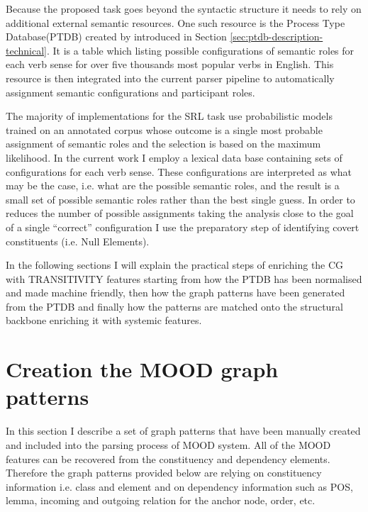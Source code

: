 Because the proposed task goes beyond the syntactic structure it needs to rely on additional external semantic resources. One such resource is the Process Type Database(PTDB) created by \citet{Neale2002} introduced in Section \ref{sec:ptdb-description-technical}. It is a table which listing possible configurations of semantic roles for each verb sense for over five thousands most popular verbs in English. This resource is then integrated into the current parser pipeline to automatically assignment semantic configurations and participant roles.


The majority of implementations for the SRL task use probabilistic models trained on an annotated corpus whose outcome is a single most probable assignment of semantic roles and the selection is based on the maximum likelihood. In the current work I employ a lexical data base containing sets of configurations for each verb sense. These configurations are interpreted as what may be the case, i.e. what are the possible semantic roles, and the result is a small set of possible semantic roles rather than the best single guess. In order to reduces the number of possible assignments taking the analysis close to the goal of a single ``correct'' configuration I use the preparatory step of identifying covert constituents (i.e. Null Elements).

In the following sections I will explain the practical steps of enriching the CG with TRANSITIVITY features starting from how the PTDB has been normalised and made machine friendly, then how the graph patterns have been generated from the PTDB and finally how the patterns are matched onto the structural backbone enriching it with systemic features.



\section{Creation the MOOD graph patterns}
\label{sec:mood-patterns}
In this section I describe a set of graph patterns that have been manually created and included into the parsing process of MOOD system. All of the MOOD features can be recovered from the constituency and dependency elements. Therefore the graph patterns provided below are relying on constituency information i.e. class and element and on dependency information such as POS, lemma, incoming and outgoing relation for the anchor node, order, etc. 

